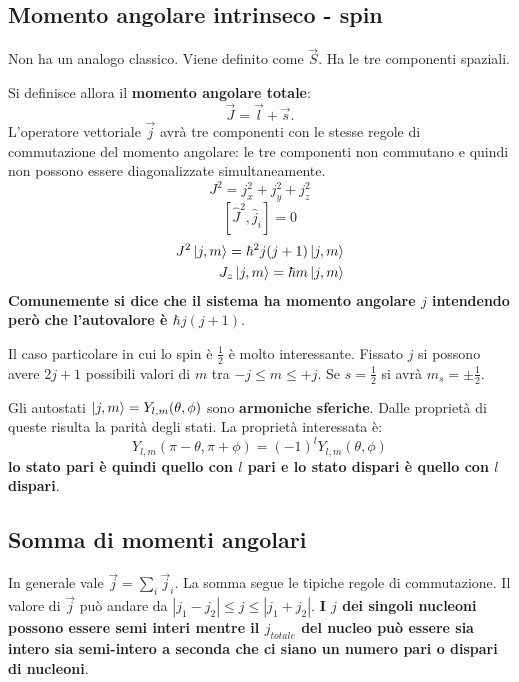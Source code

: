 \documentclass[a4paper,11pt,twoside,openany]{book}
\theoremstyle{definition}
\theoremstyle{plain}
\theoremstyle{plain}
\theoremstyle{definition}
\begin{document}
\subsection{Momento angolare intrinseco - spin} %
Non ha un analogo classico. Viene definito come $\vec S$. Ha le tre componenti spaziali.

Si definisce allora il \textbf{momento angolare totale}:
\begin{equation}
\vec J=\vec l +\vec s.
\end{equation}
L'operatore vettoriale $\vec j$ avrà tre componenti con le stesse regole di commutazione del momento angolare: le tre componenti non commutano e quindi non possono essere diagonalizzate simultaneamente.
\begin{equation}
J^2=j^2_x+j^2_y+j^2_z
\end{equation}
\begin{equation}
\left[\hat J^2,\hat j_i\right]=0
\end{equation}
\begin{equation}\begin{split}
J^2\ket {j,m}=\hbar^2 j(j+1)\ket {j,m} \\
J_z \ket {j,m}=\hbar m \ket{j,m}
\end{split}\end{equation}
\textbf{Comunemente si dice che il sistema ha momento angolare $j$ intendendo però che l'autovalore è $\hbar j(j+1)$}.

Il caso particolare in cui lo spin è $\frac{1}{2}$ è molto interessante. Fissato $j$ si possono avere $2j+1$ possibili valori di $m$ tra $-j\le m \le +j$. Se $s=\frac{1}{2}$ si avrà $m_s=\pm\frac{1}{2}$.

Gli autostati $\ket{j,m}=Y_{l,m}(\theta,\phi)$ sono \textbf{armoniche sferiche}. Dalle proprietà di queste risulta la parità degli stati. La proprietà interessata è:
\begin{equation}
Y_{l,m}(\pi-\theta,\pi+\phi)=(-1)^lY_{l,m}(\theta,\phi)
\end{equation}
\textbf{lo stato pari è quindi quello con $l$ pari e lo stato dispari è quello con $l$ dispari}.

\subsection{Somma di momenti angolari} %
In generale vale $\vec j=\sum_i{\vec j_i}$. La somma segue le tipiche regole di commutazione. Il valore di $\vec j$ può andare da $\left|j_1-j_2\right|\le j\le\left|j_1+j_2\right|$. \textbf{I $j$ dei singoli nucleoni possono essere semi interi mentre il $j_{totale}$ del nucleo può essere sia intero sia semi-intero a seconda che ci siano un numero pari o dispari di nucleoni}.
\end{document}
